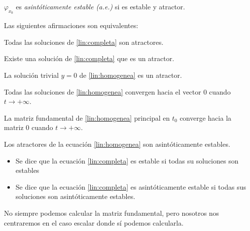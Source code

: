 \begin{ndef}
 $\varphi_{x_0}$ es \emph{asintóticamente estable (a.e.)} si es estable y atractor.
\end{ndef}



\begin{nprop}
Las siguientes afirmaciones son equivalentes:
\begin{nlist}
\item Todas las soluciones de \eqref{lin:completa} son atractores.
\item Existe una solución de \eqref{lin:completa} que es un atractor.
\item La solución trivial $y = 0$ de \eqref{lin:homogenea} es un atractor.
\item Todas las soluciones de \eqref{lin:homogenea} convergen hacia el vector 0 cuando $t \to +\infty$.
\item La matriz fundamental de \eqref{lin:homogenea} principal en $t_0$ converge hacia la matriz 0 cuando $t \to +\infty$.
\end{nlist}
\end{nprop}

\begin{ncor}
Los atractores de la ecuación \eqref{lin:homogenea} son asintóticamente estables.
\end{ncor}

\begin{ndef}
\begin{itemize}
\item Se dice que la ecuación \eqref{lin:completa} es estable si todas su soluciones son estables
\item Se dice que la ecuación \eqref{lin:completa} es asintóticamente estable si todas sus soluciones son asintóticamente estables.
\end{itemize}
\end{ndef}

No siempre podemos calcular la matriz fundamental, pero nosotros nos centraremos en el caso escalar donde sí podemos calcularla.


